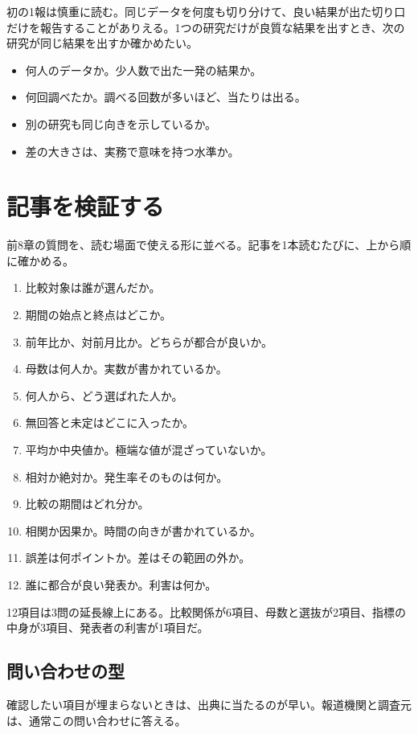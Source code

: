 \documentclass{article}
\begin{document}
初の1報は慎重に読む。同じデータを何度も切り分けて、良い結果が出た切り口だけを報告することがありえる。1つの研究だけが良質な結果を出すとき、次の研究が同じ結果を出すか確かめたい。

\begin{itemize}
\item 何人のデータか。少人数で出た一発の結果か。
\item 何回調べたか。調べる回数が多いほど、当たりは出る。
\item 別の研究も同じ向きを示しているか。
\item 差の大きさは、実務で意味を持つ水準か。
\end{itemize}

\section{記事を検証する}

前8章の質問を、読む場面で使える形に並べる。記事を1本読むたびに、上から順に確かめる。

\begin{enumerate}
\item 比較対象は誰が選んだか。
\item 期間の始点と終点はどこか。
\item 前年比か、対前月比か。どちらが都合が良いか。
\item 母数は何人か。実数が書かれているか。
\item 何人から、どう選ばれた人か。
\item 無回答と未定はどこに入ったか。
\item 平均か中央値か。極端な値が混ざっていないか。
\item 相対か絶対か。発生率そのものは何か。
\item 比較の期間はどれ分か。
\item 相関か因果か。時間の向きが書かれているか。
\item 誤差は何ポイントか。差はその範囲の外か。
\item 誰に都合が良い発表か。利害は何か。
\end{enumerate}

12項目は3問の延長線上にある。比較関係が6項目、母数と選抜が2項目、指標の中身が3項目、発表者の利害が1項目だ。

\subsection{問い合わせの型}

確認したい項目が埋まらないときは、出典に当たるのが早い。報道機関と調査元は、通常この問い合わせに答える。
\end{document}
